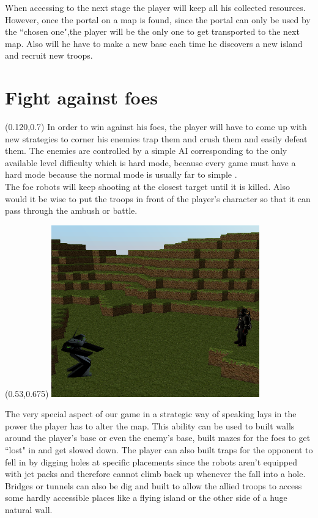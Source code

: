 \documentclass[article]{report}         %
\begin{document}
When accessing to the next stage the player will keep all his collected resources. However, once the portal on a map is found, since the portal can only be used by the ``chosen one",the player will be the only one to get transported to the next map. Also will he have to make a new base each time he discovers a new island and recruit new troops. \\

      \section{Fight against foes}

    \begin{textblock}{0.4}(0.120,0.7)
   In order to win against his foes, the player will have to come up with new strategies to corner his enemies trap them and crush them and easily defeat them. The enemies are controlled by a simple AI corresponding to the only available level difficulty which is hard mode, because every game must have a hard mode because the normal mode is usually far to simple .\\

  The foe robots will keep shooting at the closest target until it is killed. Also would it be wise to put the troops in front of the player's character so that it can pass through the ambush or battle.\\
    \end{textblock}

    \begin{textblock}{0.6}(0.53,0.675)
    \includegraphics[width=9cm]{images/shoot.png}
    \end{textblock}


 \newpage

  The very special aspect of our game in a strategic way of speaking lays in the power the player has to alter the map. This ability can be used to built walls around the player's base or even the enemy's base, built mazes for the foes to get ``lost" in and get slowed down. The player can also built traps for the opponent to fell in by digging holes at specific placements since the robots aren't equipped with jet packs and therefore cannot climb back up whenever the fall into a hole. Bridges or tunnels can also be dig and built to allow the allied troops to access some hardly accessible places like a flying island or the other side of a huge natural wall. \\
\end{document}
